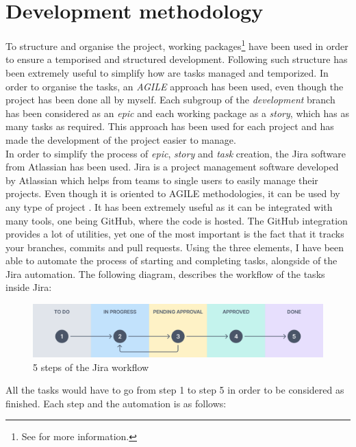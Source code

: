 \documentclass[a4paper, 12pt, oneside]{book}
\begin{document}
\section{Development methodology}
To structure and organise the project, working packages\footnote{See  for more information.} have been used in order to ensure a temporised and structured development. Following such structure has been extremely useful to simplify how are tasks managed and temporized. In order to organise the tasks, an \emph{AGILE} approach has been used, even though the project has been done all by myself. Each subgroup of the \emph{development} branch has been considered as an \emph{epic} and each working package as a \emph{story}, which has as many tasks as required. This approach has been used for each project and has made the development of the project easier to manage.
\\[8pt]
In order to simplify the process of \emph{epic}, \emph{story} and \emph{task} creation, the Jira software from Atlassian has been used. Jira is a project management software developed by Atlassian which helps from teams to single users to easily manage their projects. Even though it is oriented to AGILE methodologies, it can be used by any type of project \cite{jira}. It has been extremely useful as it can be integrated with many tools, one being GitHub, where the code is hosted. The GitHub integration provides a lot of utilities, yet one of the most important is the fact that it tracks your branches, commits and pull requests. Using the three elements, I have been able to automate the process of starting and completing tasks, alongside of the Jira automation. The following diagram, describes the workflow of the tasks inside Jira:
\begin{figure}[H]
	\centering
	\includegraphics[width=\textwidth]{assets/working-packages/JiraWorkflow.png}
	\caption{5 steps of the Jira workflow}
\end{figure}
All the tasks would have to go from step 1 to step 5 in order to be considered as finished. Each step and the automation is as follows:
\end{document}
